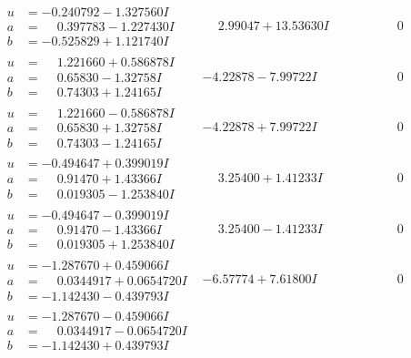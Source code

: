 \documentclass[1p]{elsarticle_modified}
\theoremstyle{definition}
\begin{document}
$$\begin{array}{c|c|c}
\begin{aligned}
u &= -0.240792 - 1.327560 I \\
a &= \phantom{-}0.397783 - 1.227430 I \\
b &= -0.525829 + 1.121740 I\end{aligned}
 & \phantom{-}2.99047 + 13.53630 I & \phantom{-0.000000 } 0 \\ \hline\begin{aligned}
u &= \phantom{-}1.221660 + 0.586878 I \\
a &= \phantom{-}0.65830 - 1.32758 I \\
b &= \phantom{-}0.74303 + 1.24165 I\end{aligned}
 & -4.22878 - 7.99722 I & \phantom{-0.000000 } 0 \\ \hline\begin{aligned}
u &= \phantom{-}1.221660 - 0.586878 I \\
a &= \phantom{-}0.65830 + 1.32758 I \\
b &= \phantom{-}0.74303 - 1.24165 I\end{aligned}
 & -4.22878 + 7.99722 I & \phantom{-0.000000 } 0 \\ \hline\begin{aligned}
u &= -0.494647 + 0.399019 I \\
a &= \phantom{-}0.91470 + 1.43366 I \\
b &= \phantom{-}0.019305 - 1.253840 I\end{aligned}
 & \phantom{-}3.25400 + 1.41233 I & \phantom{-0.000000 } 0 \\ \hline\begin{aligned}
u &= -0.494647 - 0.399019 I \\
a &= \phantom{-}0.91470 - 1.43366 I \\
b &= \phantom{-}0.019305 + 1.253840 I\end{aligned}
 & \phantom{-}3.25400 - 1.41233 I & \phantom{-0.000000 } 0 \\ \hline\begin{aligned}
u &= -1.287670 + 0.459066 I \\
a &= \phantom{-}0.0344917 + 0.0654720 I \\
b &= -1.142430 - 0.439793 I\end{aligned}
 & -6.57774 + 7.61800 I & \phantom{-0.000000 } 0 \\ \hline\begin{aligned}
u &= -1.287670 - 0.459066 I \\
a &= \phantom{-}0.0344917 - 0.0654720 I \\
b &= -1.142430 + 0.439793 I\end{aligned}

\end{array}$$
\end{document}
